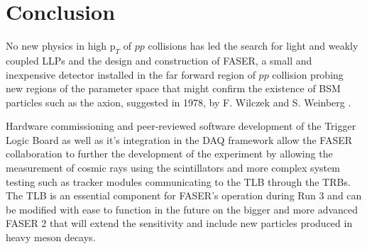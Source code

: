 \chapter{Conclusion}

\ifpdf
    \graphicspath{{Conclusion/Figs/Raster/}{Conclusion/Figs/PDF/}{Conclusion/Figs/}}
\else
    \graphicspath{{Conclusion/Figs/Vector/}{Conclusion/Figs/}}
\fi

No new physics in high $\text{p}_{T}$ of $pp$ collisions has led the search for light and weakly coupled LLPs and the design and construction of FASER, a small and inexpensive detector installed in the far forward region of $pp$ collision probing new regions of the parameter space that might confirm the existence of BSM particles such as the axion, suggested in 1978, by F. Wilczek and S. Weinberg \cite{weinberg_new_1978,wilczek_problem_1978}.

Hardware commissioning and peer-reviewed software development of the Trigger Logic Board as well as it's integration in the DAQ framework allow the FASER collaboration to further the development of the experiment by allowing the measurement of cosmic rays using the scintillators and more complex system testing such as tracker modules communicating to the TLB through the TRBs. The TLB is an essential component for FASER's operation during Run 3 and can be modified with ease to function in the future on the bigger and more advanced FASER 2 that will extend the sensitivity and include new particles produced in heavy meson decays.